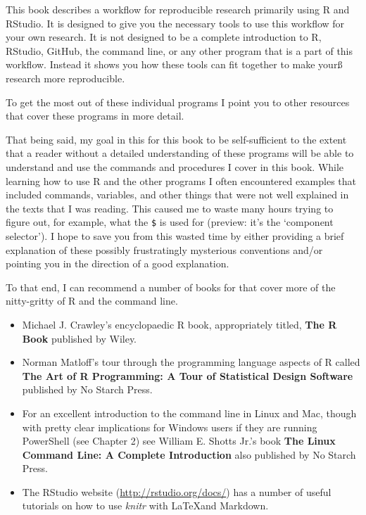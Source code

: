 \documentclass[ChapterTOCs,krantz1]{krantz}\usepackage{graphicx, color}
\begin{document}
This book describes a workflow for reproducible research primarily using R and RStudio. It is designed to give you the necessary tools to use this workflow for your own research. It is not designed to be a complete introduction to R, RStudio, GitHub, the command line, or any other program that is a part of this workflow. Instead it shows you how these tools can fit together to make yourß research more reproducible.

To get the most out of these individual programs I point you to other resources that cover these programs in more detail.

That being said, my goal in this for this book to be self-sufficient to the extent that a reader without a detailed understanding of these programs will be able to understand and use the commands and procedures
I cover in this book. While learning how to use R and the other programs I often encountered examples that included commands, variables, and other things that were not well explained in the texts that I was reading. This caused me to waste many hours trying to figure out, for example, what the \texttt{\$} is used for (preview: it's the `component selector'). I hope to save you from this wasted time by either providing a brief explanation of
these possibly frustratingly mysterious conventions and/or pointing you in the direction of a good explanation.

To that end, I can recommend a number of books for that cover more of the nitty-gritty of R and the command line.

\begin{itemize}
    \item Michael J. Crawley's encyclopaedic R book, appropriately   titled, \textbf{The R Book} published by Wiley.
    
    \item Norman Matloff's tour through the programming language aspects of  R called \textbf{The Art of R Programming: A Tour of Statistical Design Software} published by No Starch Press.
    
    \item For an excellent introduction to the command line in Linux and Mac, though with pretty clear implications for Windows users if they are running PowerShell (see Chapter 2) see William E. Shotts Jr.'s book \textbf{The Linux Command Line: A Complete Introduction} also published by No Starch Press.
    
    \item The RStudio website (\url{http://rstudio.org/docs/}) has a
  number of useful tutorials on how to use {\emph{knitr}} with \LaTeX and Markdown.
\end{itemize}
\end{document}
